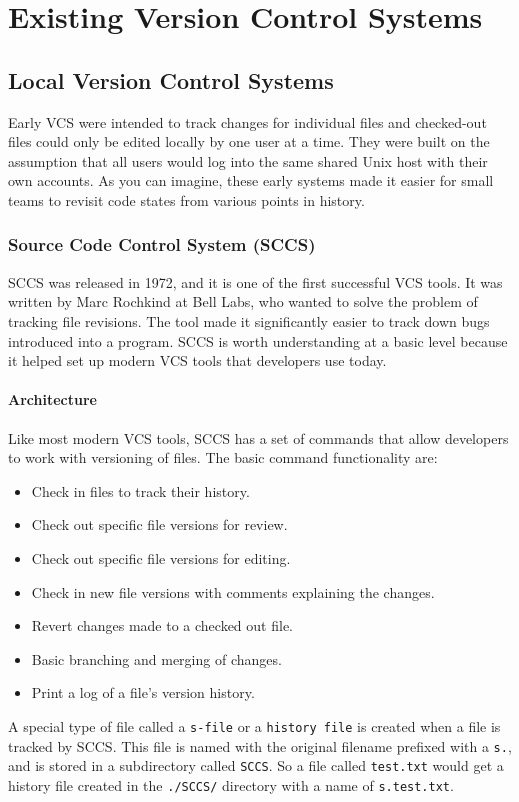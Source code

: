 \section{Existing Version Control Systems}
\subsection{Local Version Control Systems}
Early VCS were intended to track changes for individual files and checked-out files could only be edited locally by one user at a time. They were built on the assumption that all users would log into the same shared Unix host with their own accounts. As you can imagine, these early systems made it easier for small teams to revisit code states from various points in history.
\subsubsection{Source Code Control System (SCCS)}
SCCS was released in 1972, and it is one of the first successful VCS tools. It was written by Marc Rochkind at Bell Labs, who wanted to solve the problem of tracking file revisions. The tool made it significantly easier to track down bugs introduced into a program. SCCS is worth understanding at a basic level because it helped set up modern VCS tools that developers use today.
\paragraph{Architecture}
Like most modern VCS tools, SCCS has a set of commands that allow developers to work with versioning of files. The basic command functionality are:
\begin{itemize}
    \item Check in files to track their history.
    \item Check out specific file versions for review.
    \item Check out specific file versions for editing.
    \item Check in new file versions with comments explaining the changes.
    \item Revert changes made to a checked out file.
    \item Basic branching and merging of changes.
    \item Print a log of a file's version history.
\end{itemize}
A special type of file called a \lstinline{s-file} or a \lstinline{history file} is created when a file is tracked by SCCS. This file is named with the original filename prefixed with a \lstinline{s.}, and is stored in a subdirectory called \lstinline{SCCS}. So a file called \lstinline{test.txt} would get a history file created in the \lstinline{./SCCS/} directory with a name of \lstinline{s.test.txt}.
